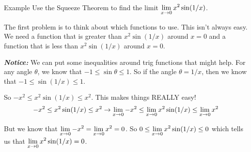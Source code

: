 \begin{note}{Example}
  Use the Squeeze Theorem to find the limit $\displaystyle \lim_{x\to 0} x^2\sin(1/x)$.

  The first problem is to think about which functions to use.
  This isn't always easy.
  We need a function that is greater than $x^2\sin(1/x)$ around $x=0$ and a function that is less than $x^2\sin(1/x)$ around $x=0$.

  \textbf{\textit{Notice:}}
  We can put some inequalities around trig functions that might help. 
  For any angle $\theta$, we know that $-1\leq \sin \theta \leq 1$.
  So if the angle $\theta = 1/x$, then we know that $-1\leq \sin(1/x) \leq 1$.

  So $-x^2 \leq x^2 \sin (1/x) \leq x^2$.
  This makes things REALLY easy!
  \[-x^2 \leq x^2 \sin (1/x) \leq x^2 \to \displaystyle \lim_{x\to0} -x^2 \leq \displaystyle \lim_{x\to0} x^2 \sin (1/x) \leq \displaystyle \lim_{x\to0} x^2\]

  But we know that $\displaystyle \lim_{x\to0} -x^2 = \displaystyle \lim_{x\to0} x^2 = 0$.
  So $0\leq \displaystyle \lim_{x\to0} x^2 \sin (1/x) \leq 0$ which tells us that $\displaystyle \lim_{x\to0} x^2 \sin (1/x)=0$.
\end{note}
